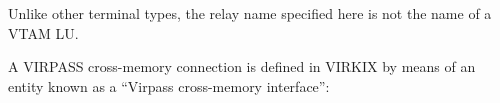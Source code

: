 \documentclass[letterpaper,10pt,english]{sphinxmanual}
\begin{document}
Unlike other terminal types, the relay name specified here is not the name of a VTAM LU.



A VIRPASS cross-memory connection is defined in VIRKIX by means of an entity known as a “Virpass cross-memory interface”:

\begin{sphinxVerbatim}[commandchars=\\\{\}]
                
                                                                
   

\end{sphinxVerbatim}
\end{document}
